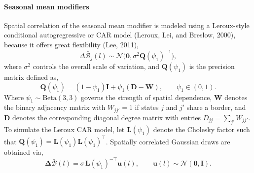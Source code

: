 \documentclass[11pt]{article}
\newcommand{\Normal}{\mathcal{N}}
\begin{document}
\paragraph{Seasonal mean modifiers}
Spatial correlation of the seasonal mean modifier is modeled using a Leroux-style conditional autogregressive or CAR model (Leroux, Lei, and Breslow, 2000), because it offers great flexibility (Lee, 2011),
\begin{equation}
    \Delta \bar{\mathcal{B}}_j(l) \sim \Normal\big(\bm{0}, \sigma^2 \bm{Q}(\psi_1)^{-1}\big),
\end{equation}
where $\sigma^2$ controls the overall scale of variation, and $\bm{Q}(\psi_1)$ is the precision matrix defined as,
\begin{equation}
    \bm{Q}(\psi_1) = (1 - \psi_1)\bm{I} + \psi_1 (\bm{D} - \bm{W}), 
    \qquad \psi_1 \in (0,1).
\end{equation}
Where $\psi_1 \sim \text{Beta}(3,3)$ governs the strength of spatial dependence, $\bm{W}$ denotes the binary adjacency matrix with $W_{jj'} = 1$ if states $j$ and $j'$ share a border, and $\bm{D}$ denotes the corresponding diagonal degree matrix with entries $D_{jj} = \sum_{j'} W_{jj'}$. To simulate the Leroux CAR model, let $\bm{L}(\psi_1)$ denote the Cholesky factor such that $\bm{Q}(\psi_1) = \bm{L}(\psi_1)\bm{L}(\psi_1)^\top$. Spatially correlated Gaussian draws are obtained via,
\begin{equation}
    \bm{\Delta \bar{\mathcal{B}}}(l) = \sigma \, \bm{L}(\psi_1)^{-\top} \bm{u}(l), 
    \qquad \bm{u}(l) \sim \Normal(\bm{0}, \bm{I}).
\end{equation}

\end{document}

